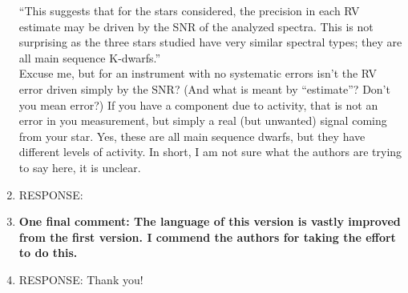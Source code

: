 \documentclass[11pt]{article}   	%
\begin{document}
\begin{enumerate}
{``This suggests that for the stars considered, the precision in each RV estimate may be driven by the SNR of the analyzed spectra. This is not surprising as the three stars studied have very similar spectral types; they are all main sequence K-dwarfs.'' \\

Excuse me, but for an instrument with no systematic errors isn't the RV error driven simply by the SNR? (And what is meant by ``estimate''? Don't you mean error?) If you have a component due to activity, that is not an error in you measurement, but simply a real (but unwanted) signal coming from your star. Yes, these are all main sequence dwarfs, but they have different levels of activity. In short, I am not sure what the authors are trying to say here, it is unclear.}
%
\item[]  RESPONSE:  
\bigskip
%
%
\item {\bf One final comment: The language of this version is vastly improved from the first version. I commend the authors for taking the effort to do this.}
%
\item[]  RESPONSE:  Thank you!
\bigskip
%
%
\end{enumerate}
\end{document}
